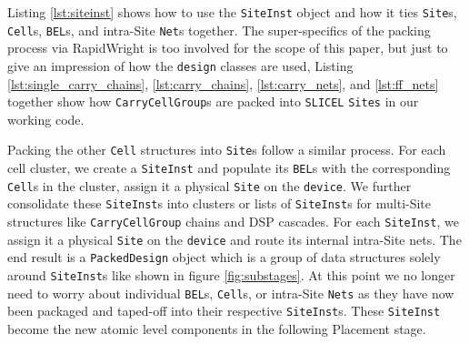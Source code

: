
Listing \ref{lst:siteinst} shows how to use the \texttt{SiteInst} object and how it ties \texttt{Site}s, \texttt{Cell}s, \texttt{BEL}s, and intra-Site \texttt{Net}s together. 
The super-specifics of the packing process via RapidWright is too involved for the scope of this paper, but just to give an impression of how the \texttt{design} classes are used, Listing \ref{lst:single_carry_chains}, \ref{lst:carry_chains}, \ref{lst:carry_nets}, and \ref{lst:ff_nets} together show how \texttt{CarryCellGroup}s are packed into \texttt{SLICEL} \texttt{Sites} in our working code. 

Packing the other \texttt{Cell} structures into \texttt{Site}s follow a similar process. 
For each cell cluster, we create a \texttt{SiteInst} and populate its \texttt{BEL}s with the corresponding \texttt{Cell}s in the cluster, assign it a physical \texttt{Site} on the \texttt{device}.
We further consolidate these \texttt{SiteInst}s into clusters or lists of \texttt{SiteInst}s for multi-Site structures like \texttt{CarryCellGroup} chains and DSP cascades. 
For each \texttt{SiteInst}, we assign it a physical \texttt{Site} on the \texttt{device} and route its internal intra-Site nets. 
The end result is a \texttt{PackedDesign} object which is a group of data structures solely around \texttt{SiteInst}s like shown in figure \ref{fig:substages}.
At this point we no longer need to worry about individual \texttt{BEL}s, \texttt{Cell}s, or intra-Site \texttt{Nets} as they have now been packaged and taped-off into their respective \texttt{SiteInst}s. 
These \texttt{SiteInst} become the new atomic level components in the following Placement stage. 

